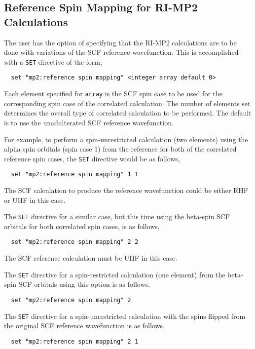 \subsection{Reference Spin Mapping for RI-MP2 Calculations}

The user has the option of specifying that the RI-MP2 calculations are
to be done with variations of the SCF reference wavefunction.  This is
accomplished with a \verb+SET+ directive of the form,

\begin{verbatim}
  set "mp2:reference spin mapping" <integer array default 0>
\end{verbatim}

Each element specified for \verb+array+ is the SCF spin case to be
used for the corresponding spin case of the correlated calculation.
The number of elements set determines the overall type of correlated
calculation to be performed.  The default is to use the unadulterated
SCF reference wavefunction.

For example, to perform a spin-unrestricted calculation (two elements)
using the alpha spin orbitals (spin case 1) from the reference for
both of the correlated reference spin cases, the \verb+SET+ directive
would be as follows,
\begin{verbatim}
  set "mp2:reference spin mapping" 1 1
\end{verbatim}
The SCF calculation to produce the reference wavefunction could be either
RHF or UHF in this case.

The \verb+SET+ directive for a similar case, but this time using the
beta-spin SCF orbitals for both correlated spin cases, is as follows,
\begin{verbatim}
  set "mp2:reference spin mapping" 2 2
\end{verbatim}
The SCF reference calculation must be UHF in this case.

The \verb+SET+ directive for a spin-restricted calculation (one
element) from the beta-spin SCF orbitals using this option is as
follows,
\begin{verbatim}
  set "mp2:reference spin mapping" 2
\end{verbatim}

The \verb+SET+ directive for a spin-unrestricted calculation with the
spins flipped from the original SCF reference wavefunction is as
follows,
\begin{verbatim}
  set "mp2:reference spin mapping" 2 1
\end{verbatim}


